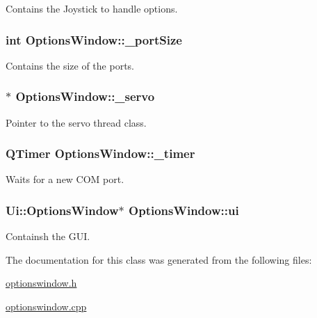 Contains the Joystick to handle options. 

\hypertarget{class_options_window_a9bd4dccc7a544b1db78dc8cf330b88f6}{}
\subsubsection[{\+\_\+port\+Size}]{\setlength{\rightskip}{0pt plus 5cm}int Options\+Window\+::\+\_\+port\+Size\hspace{0.3cm}{\ttfamily [private]}}\label{class_options_window_a9bd4dccc7a544b1db78dc8cf330b88f6}


Contains the size of the ports. 

\hypertarget{class_options_window_acba1566fea3f831000d5e1c1edc3e776}{}
\subsubsection[{\+\_\+servo}]{$\ast$ Options\+Window\+::\+\_\+servo\hspace{0.3cm}{\ttfamily [private]}}\label{class_options_window_acba1566fea3f831000d5e1c1edc3e776}


Pointer to the servo thread class. 

\hypertarget{class_options_window_af6320942b8558140989f552b3bbc1fbd}{}
\subsubsection[{\+\_\+timer}]{\setlength{\rightskip}{0pt plus 5cm}Q\+Timer Options\+Window\+::\+\_\+timer\hspace{0.3cm}{\ttfamily [private]}}\label{class_options_window_af6320942b8558140989f552b3bbc1fbd}


Waits for a new C\+O\+M port. 

\hypertarget{class_options_window_a8347442d5b3b670e8fff0c4102db1f88}{}
\subsubsection[{ui}]{\setlength{\rightskip}{0pt plus 5cm}Ui\+::\+Options\+Window$\ast$ Options\+Window\+::ui\hspace{0.3cm}{\ttfamily [private]}}\label{class_options_window_a8347442d5b3b670e8fff0c4102db1f88}


Containsh the G\+U\+I. 



The documentation for this class was generated from the following files\+:\begin{DoxyCompactItemize}
\item 
\hyperlink{optionswindow_8h}{optionswindow.\+h}\item 
\hyperlink{optionswindow_8cpp}{optionswindow.\+cpp}\end{DoxyCompactItemize}
